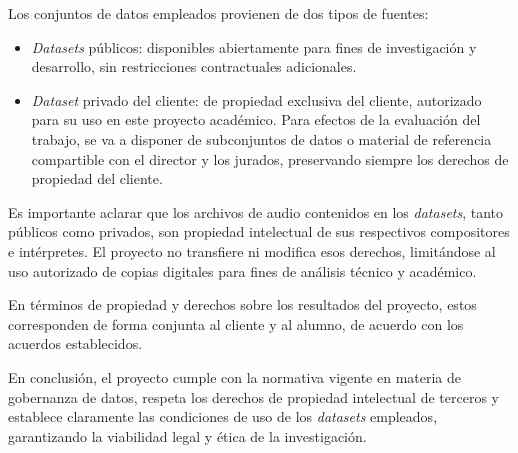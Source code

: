 \documentclass[
11pt, %
]{charter}
\begin{document}
Los conjuntos de datos empleados provienen de dos tipos de fuentes:
\begin{itemize}
  \item \textit{Datasets} públicos: disponibles abiertamente para fines de investigación y desarrollo, sin restricciones contractuales adicionales.
  \item \textit{Dataset} privado del cliente: de propiedad exclusiva del cliente, autorizado para su uso en este proyecto académico. Para efectos de la evaluación del trabajo, se va a disponer de subconjuntos de datos o material de referencia compartible con el director y los jurados, preservando siempre los derechos de propiedad del cliente.
\end{itemize}

Es importante aclarar que los archivos de audio contenidos en los \textit{datasets}, tanto públicos como privados, son propiedad intelectual de sus respectivos compositores e intérpretes. El proyecto no transfiere ni modifica esos derechos, limitándose al uso autorizado de copias digitales para fines de análisis técnico y académico.

En términos de propiedad y derechos sobre los resultados del proyecto, estos corresponden de forma conjunta al cliente y al alumno, de acuerdo con los acuerdos establecidos. 

En conclusión, el proyecto cumple con la normativa vigente en materia de gobernanza de datos, respeta los derechos de propiedad intelectual de terceros y establece claramente las condiciones de uso de los \textit{datasets} empleados, garantizando la viabilidad legal y ética de la investigación.
\end{document}
